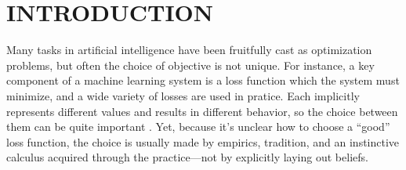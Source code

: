 \documentclass[twoside]{article}
\theoremstyle{plain}
\theoremstyle{definition}
\begin{document}
\section{INTRODUCTION}
Many tasks in artificial intelligence have been fruitfully cast as optimization problems, but often the choice of objective is not unique.
%
For instance, a key component of a machine learning system is a loss
function which the system must minimize,
and a wide variety of losses are used in pratice.
Each implicitly represents different values and results in different
behavior, so the choice between them can be quite important
\parencite{wang2020comprehensive,jadon2020survey}.
Yet,
because it's unclear how to choose a ``good'' loss function,
the choice is usually made by empirics, tradition, and an instinctive calculus acquired through the practice---not by explicitly laying out beliefs.
\end{document}
